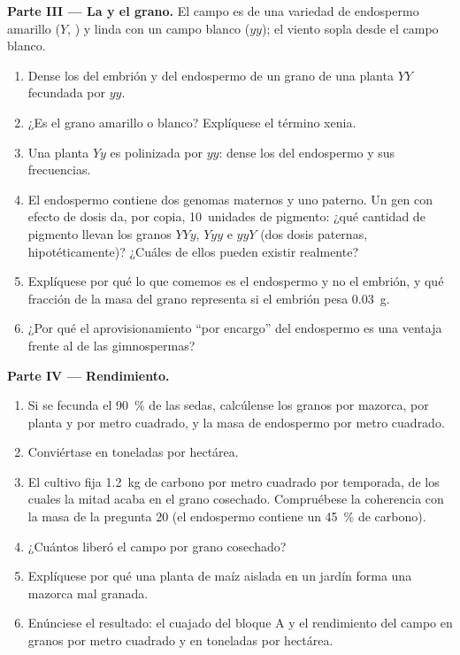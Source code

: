 \begin{problem}
\medskip
\noindent\textbf{Parte III --- La  y el grano.}
El campo es de una variedad de endospermo amarillo ($Y$, ) y
linda con un campo blanco ($yy$); el viento sopla desde el campo blanco.
\begin{enumerate}[resume]
  \item Dense los  del embrión y del endospermo de un grano de
        una planta $YY$ fecundada por  $yy$.
  \item ¿Es el grano amarillo o blanco? Explíquese el término xenia.
  \item Una planta $Yy$ es polinizada por  $yy$: dense los
         del endospermo y sus frecuencias.
  \item El endospermo contiene dos genomas maternos y uno paterno. Un gen
        con efecto de dosis da, por copia, 10~unidades de pigmento: ¿qué
        cantidad de pigmento llevan los granos $YYy$, $Yyy$ e $yyY$ (dos
        dosis paternas, hipotéticamente)? ¿Cuáles de ellos pueden existir
        realmente?
  \item Explíquese por qué lo que comemos es el endospermo y no el
        embrión, y qué fracción de la masa del grano representa si el
        embrión pesa \qty{0.03}{g}.
  \item ¿Por qué el aprovisionamiento ``por encargo'' del endospermo es
        una ventaja frente al de las gimnospermas?
\end{enumerate}

\medskip
\noindent\textbf{Parte IV --- Rendimiento.}
\begin{enumerate}[resume]
  \item Si se fecunda el \qty{90}{\%} de las sedas, calcúlense los granos
        por mazorca, por planta y por metro cuadrado, y la masa de
        endospermo por metro cuadrado.
  \item Conviértase en toneladas por hectárea.
  \item El cultivo fija \qty{1.2}{kg} de carbono por metro cuadrado por
        temporada, de los cuales la mitad acaba en el grano cosechado.
        Compruébese la coherencia con la masa de la pregunta 20 (el
        endospermo contiene un \qty{45}{\%} de carbono).
  \item ¿Cuántos  liberó el campo por grano cosechado?
  \item Explíquese por qué una planta de maíz aislada en un jardín forma
        una mazorca mal granada.
  \item Enúnciese el resultado: el cuajado del bloque A y el rendimiento
        del campo en granos por metro cuadrado y en toneladas por
        hectárea.
\end{enumerate}
\end{problem}
